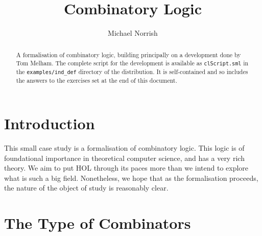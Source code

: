 \documentclass[12pt]{article}
\title{Combinatory Logic}
\author{Michael Norrish}
\date{}
\begin{document}
\maketitle

\begin{abstract}
  A formalisation of combinatory logic, building principally on a
  development done by Tom Melham.  The complete script for the
  development is available as \texttt{clScript.sml} in the
  \texttt{examples/ind\_def} directory of the distribution.  It is
  self-contained and so includes the answers to the exercises set at
  the end of this document.
\end{abstract}


\section{Introduction}
\label{sec:Introduction}

This small case study is a formalisation of combinatory logic.  This
logic is of foundational importance in theoretical computer science,
and has a very rich theory.  We aim to put HOL through its paces more
than we intend to explore what is such a big field.  Nonetheless, we
hope that as the formalisation proceeds, the nature of the object of
study is reasonably clear.


\section{The Type of Combinators}
\label{sec:Type-Combinators}
\end{document}

